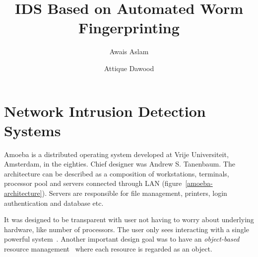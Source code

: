 \documentclass{article}
\begin{document}
\title{IDS Based on Automated Worm Fingerprinting}
\author{Awais Aslam \and Attique Dawood}
\maketitle

\section{Network Intrusion Detection Systems}

Amoeba is a distributed operating system developed at Vrije Universiteit, Amsterdam, in the eighties. Chief designer was Andrew S. Tanenbaum. The architecture can be described as a composition of workstations, terminals, processor pool and servers connected through LAN (figure~\ref{amoeba-architecture}). Servers are responsible for file management, printers, login authentication and database etc.

It was designed to be transparent with user not having to worry about underlying hardware, like number of processors. The user only sees interacting with a single powerful system~\cite{amoeba-sourceforge}. Another important design goal was to have an \emph{object-based} resource management~\cite{distributed-systems-coulouris} where each resource is regarded as an object.

\begin{figure*}
\centering
{}
\caption{Amoeba architecture.}
\label{amoeba-architecture}
\end{figure*}

\nocite{*}

\end{document}
